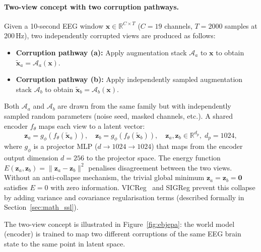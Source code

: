\documentclass[11pt,a4paper]{article}
\begin{document}
\paragraph{Two-view concept with two corruption pathways.}
Given a 10-second EEG window $\mathbf{x} \in \mathbb{R}^{C \times T}$
($C{=}19$ channels, $T{=}2000$ samples at 200\,Hz), two independently corrupted
views are produced as follows:
\begin{itemize}[noitemsep]
  \item \textbf{Corruption pathway (a):} Apply augmentation stack $\mathcal{A}_a$ to
    $\mathbf{x}$ to obtain $\tilde{\mathbf{x}}_a = \mathcal{A}_a(\mathbf{x})$.
  \item \textbf{Corruption pathway (b):} Apply independently sampled augmentation
    stack $\mathcal{A}_b$ to obtain $\tilde{\mathbf{x}}_b = \mathcal{A}_b(\mathbf{x})$.
\end{itemize}
Both $\mathcal{A}_a$ and $\mathcal{A}_b$ are drawn from the same family but with
independently sampled random parameters (noise seed, masked channels, etc.).
A shared encoder $f_\theta$ maps each view to a latent vector:
\begin{equation}
  \mathbf{z}_a = g_\phi(f_\theta(\tilde{\mathbf{x}}_a)), \quad
  \mathbf{z}_b = g_\phi(f_\theta(\tilde{\mathbf{x}}_b)), \quad
  \mathbf{z}_a, \mathbf{z}_b \in \mathbb{R}^{d_p},\; d_p{=}1024,
\end{equation}
where $g_\phi$ is a projector MLP ($d \to 1024 \to 1024$) that maps from the
encoder output dimension $d{=}256$ to the projector space.
The energy function $E(\mathbf{z}_a, \mathbf{z}_b) = \|\mathbf{z}_a - \mathbf{z}_b\|^2$
penalises disagreement between the two views.
Without an anti-collapse mechanism, the trivial global minimum
$\mathbf{z}_a = \mathbf{z}_b = \mathbf{0}$ satisfies $E{=}0$ with zero information.
VICReg~\cite{vicreg} and SIGReg prevent this collapse by adding variance and
covariance regularisation terms (described formally in Section~\ref{sec:math_ssl}).

The two-view concept is illustrated in Figure~\ref{fig:ebjepa}: the world model
(encoder) is trained to map two different corruptions of the same EEG brain state to
the same point in latent space.
\end{document}
